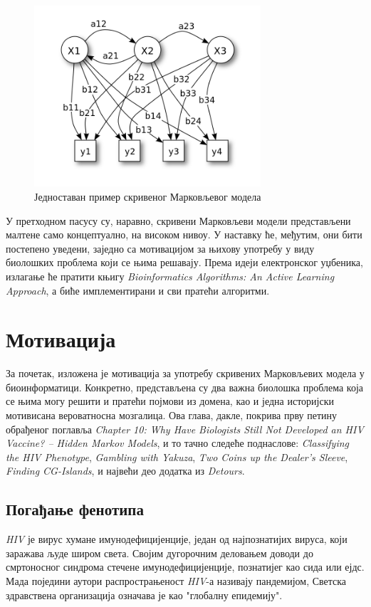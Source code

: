 \documentclass[12pt,oneside]{memoir}
\begin{document}
\begin{figure}[!ht]
  \centering
  \includegraphics[width=0.75\textwidth]{hmm.png}
  \caption{Једноставан пример скривеног Марковљевог модела\cite{hmm}}
  \label{fig:hmm}
\end{figure}

У претходном пасусу су, наравно, скривени Марковљеви модели представљени малтене само концептуално, на високом нивоу. У наставку ће, међутим, они бити постепено уведени, заједно са мотивацијом за њихову употребу у виду биолошких проблема који се њима решавају. Према идеји електронског уџбеника, излагање ће пратити књигу \textit{Bioinformatics Algorithms: An Active Learning Approach}, а биће имплементирани и сви пратећи алгоритми.

\chapter{Мотивација}
За почетак, изложена је мотивација за употребу скривених Марковљевих модела у биоинформатици. Конкретно, представљена су два важна биолошка проблема која се њима могу решити и пратећи појмови из домена, као и једна историјски мотивисана вероватносна мозгалица. Ова глава, дакле, покрива прву петину обрађеног поглавља \textit{Chapter 10: Why Have Biologists Still Not Developed an HIV Vaccine? -- Hidden Markov Models}, и то тачно следеће поднаслове: \textit{Classifying the HIV Phenotype}, \textit{Gambling with Yakuza}, \textit{Two Coins up the Dealer’s Sleeve}, \textit{Finding CG-Islands}, и највећи део додатка из \textit{Detours}.

\section{Погађање фенотипа}
\textit{HIV} је вирус хумане имунодефицијенције, један од најпознатијих вируса, који заражава људе широм света. Својим дугорочним деловањем доводи до смртоносног синдрома стечене имунодефицијенције, познатијег као сида или ејдс. Мада поједини аутори распрострањеност \textit{HIV}-а називају пандемијом, Светска здравствена организација означава је као "глобалну епидемију"\cite{who}.
\end{document}
